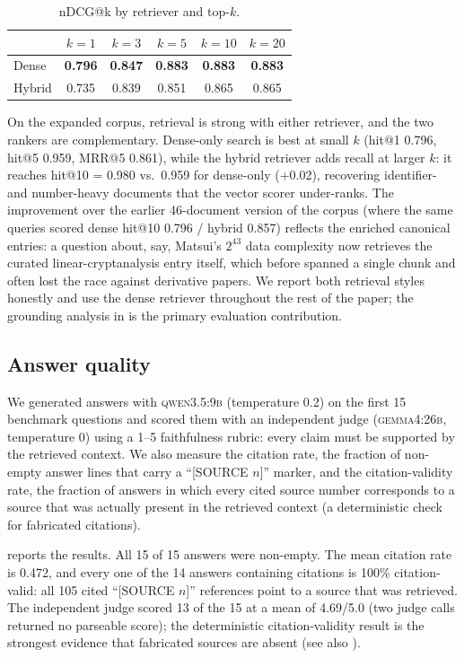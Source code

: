 \documentclass[version=submission]{iacrcc}
\begin{document}
\begin{table}[t]
\centering
\caption{nDCG@k by retriever and top-$k$.}
\label{tab:eval3}
\begin{tabular}{lccccc}
\toprule
 & $k{=}1$ & $k{=}3$ & $k{=}5$ & $k{=}10$ & $k{=}20$\\
\midrule
Dense   & \textbf{0.796} & \textbf{0.847} & \textbf{0.883} & \textbf{0.883} & \textbf{0.883}\\
Hybrid  & 0.735 & 0.839 & 0.851 & 0.865 & 0.865\\
\bottomrule
\end{tabular}
\end{table}

On the expanded corpus, retrieval is strong with either retriever, and the
two rankers are complementary. Dense-only search is best at small $k$
(hit@1 0.796, hit@5 0.959, MRR@5 0.861), while the hybrid retriever adds
recall at larger $k$: it reaches hit@10 = 0.980 vs.\ 0.959 for dense-only
(+0.02), recovering identifier- and number-heavy documents that the vector
scorer under-ranks. The improvement over the earlier 46-document version of
the corpus (where the same queries scored dense hit@10 0.796 / hybrid 0.857)
reflects the enriched canonical entries: a question about, say, Matsui's
$2^{43}$ data complexity now retrieves the curated linear-cryptanalysis
entry itself, which before spanned a single chunk and often lost the race
against derivative papers. We report both retrieval styles honestly and
use the dense retriever throughout the rest of the paper; the grounding
analysis in  is the primary evaluation contribution.

\subsection{Answer quality}
We generated answers with \textsc{qwen3.5:9b} (temperature 0.2) on the first
15 benchmark questions and scored them with an independent judge
(\textsc{gemma4:26b}, temperature 0) using a 1--5 faithfulness rubric: every
claim must be supported by the retrieved context. We also measure the citation
rate, the fraction of non-empty answer lines that carry a ``[SOURCE $n$]''
marker, and the citation-validity rate, the fraction of answers in which every
cited source number corresponds to a source that was actually present in the
retrieved context (a deterministic check for fabricated citations).

 reports the results. All 15 of 15 answers were non-empty.
The mean citation rate is 0.472, and every one of the 14 answers containing
citations is 100\% citation-valid: all 105 cited ``[SOURCE $n$]'' references
point to a source that was retrieved. The independent judge scored 13 of the
15 at a mean of 4.69/5.0 (two judge calls returned no parseable score); the
deterministic citation-validity result is the strongest evidence that
fabricated sources are absent (see also ).
\end{document}
